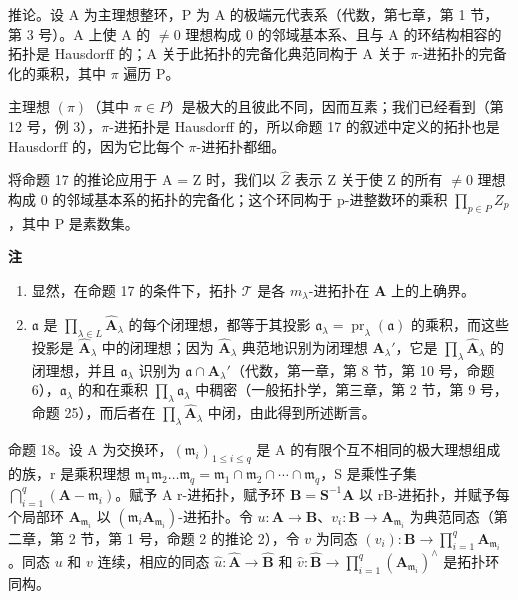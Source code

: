 推论。设 A 为主理想整环，P 为 A 的极端元代表系（代数，第七章，第 1 节，第 3 号）。A 上使 A 的 \(\neq0\) 理想构成 0 的邻域基本系、且与 A 的环结构相容的拓扑是 Hausdorff 的；A 关于此拓扑的完备化典范同构于 A 关于 \(\pi\)-进拓扑的完备化的乘积，其中 \(\pi\) 遍历 P。

主理想 \((\pi)\)（其中 \(\pi \in P\)）是极大的且彼此不同，因而互素；我们已经看到（第 12 号，例 3），\(\pi\)-进拓扑是 Hausdorff 的，所以命题 17 的叙述中定义的拓扑也是 Hausdorff 的，因为它比每个 \(\pi\)-进拓扑都细。

将命题 17 的推论应用于 A = Z 时，我们以 \(\hat{Z}\) 表示 Z 关于使 Z 的所有 \(\neq0\) 理想构成 0 的邻域基本系的拓扑的完备化；这个环同构于 p-进整数环的乘积 \(\prod_{p\in P}Z_{p}\)，其中 P 是素数集。

\textbf{注}\par

\begin{enumerate}
\def\labelenumi{(\arabic{enumi})}
\item
  显然，在命题 17 的条件下，拓扑 \(\mathcal{T}\) 是各 \(m_{\lambda}\)-进拓扑在 \(\mathbf{A}\) 上的上确界。
\item
  \(\mathfrak{a}\) 是 \(\prod_{\lambda \in L} \hat{\mathbf{A}}_{\lambda}\) 的每个闭理想，都等于其投影 \(\mathfrak{a}_{\lambda} = \operatorname{pr}_{\lambda}(\mathfrak{a})\) 的乘积，而这些投影是 \(\hat{\mathbf{A}}_{\lambda}\) 中的闭理想；因为 \(\hat{\mathbf{A}}_{\lambda}\) 典范地识别为闭理想 \(\mathbf{A}_{\lambda}'\)，它是 \(\prod_{\lambda} \hat{\mathbf{A}}_{\lambda}\) 的闭理想，并且 \(\mathfrak{a}_{\lambda}\) 识别为 \(\mathfrak{a} \cap \mathbf{A}_{\lambda}'\)（代数，第一章，第 8 节，第 10 号，命题 6），\(\mathfrak{a}_{\lambda}\) 的和在乘积 \(\prod_{\lambda} \mathfrak{a}_{\lambda}\) 中稠密（一般拓扑学，第三章，第 2 节，第 9 号，命题 25），而后者在 \(\prod_{\lambda} \hat{\mathbf{A}}_{\lambda}\) 中闭，由此得到所述断言。
\end{enumerate}

命题 18。设 A 为交换环，\((\mathfrak{m}_i)_{1 \leqslant i \leqslant q}\) 是 A 的有限个互不相同的极大理想组成的族，r 是乘积理想 \(\mathfrak{m}_1\mathfrak{m}_2 \ldots \mathfrak{m}_q = \mathfrak{m}_1 \cap \mathfrak{m}_2 \cap \cdots \cap \mathfrak{m}_q\)，S 是乘性子集 \(\bigcap_{i=1}^{q} (\mathbf{A} - \mathfrak{m}_i)\)。赋予 A r-进拓扑，赋予环 \(\mathbf{B} = \mathbf{S}^{-1}\mathbf{A}\) 以 rB-进拓扑，并赋予每个局部环 \(\mathbf{A}_{\mathfrak{m}_i}\) 以 \((\mathfrak{m}_i\mathbf{A}_{\mathfrak{m}_i})\)-进拓扑。令 \(u: \mathbf{A} \to \mathbf{B}\)、\(v_i: \mathbf{B} \to \mathbf{A}_{\mathfrak{m}_i}\) 为典范同态（第二章，第 2 节，第 1 号，命题 2 的推论 2），令 \(v\) 为同态 \((v_i): \mathbf{B} \to \prod_{i=1}^{q} \mathbf{A}_{\mathfrak{m}_i}\)。同态 \(u\) 和 \(v\) 连续，相应的同态 \(\hat{u}: \hat{\mathbf{A}} \to \hat{\mathbf{B}}\) 和 \(\hat{v}: \hat{\mathbf{B}} \to \prod_{i=1}^{q} (\mathbf{A}_{\mathfrak{m}_i})^{\wedge}\) 是拓扑环同构。

